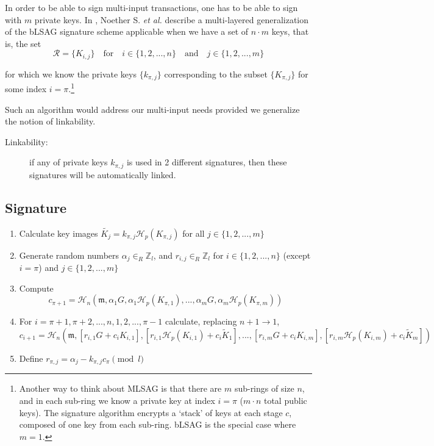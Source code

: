 In order to be able to sign multi-input transactions, one has to be able to sign with
\(m\) private keys. In \cite{cryptoeprint:2015:1098, ledger34}, Noether S. {\em et al.} describe a multi-layered generalization of the bLSAG signature scheme applicable when we have a set of \(n \cdot m\) keys, that is, the set\\
\[\mathcal{R} = \{ K_{i,j} \}  \quad \textrm{for} \quad  i \in \{1, 2, ..., n\} \quad \textrm{and} \quad j \in \{1, 2, ..., m\}\] 

for which we know the private keys \(\{k_{\pi, j} \} \) corresponding to the subset \(\{K_{\pi, j}\} \) for some index \(i = \pi\).\footnote{\label{mlsag_note}Another way to think about MLSAG is that there are $m$ sub-rings of size $n$, and in each sub-ring we know a private key at index $i = \pi$ ($m \cdot n$ total public keys). The signature algorithm encrypts a ‘stack’ of keys at each stage $c$, composed of one key from each sub-ring. bLSAG is the special case where $m = 1$.}

Such an algorithm would address our multi-input needs provided we generalize the notion of linkability.

\begin{description}
	\item[Linkability:] if any of private keys \(k_{\pi, j}\) is used in 2 different signatures, then these signatures will be automatically linked.
\end{description}

\newpage
\subsection*{Signature}

\begin{enumerate}
	
	\item Calculate key images \(\tilde{K_j} = k_{\pi, j} \mathcal{H}_p(K_{\pi, j})\) for all \(j \in \{1, 2, ..., m\}\)
	
	\item Generate random numbers  \(\alpha_j \in_R \mathbb{Z}_l\), and \(r_{i, j} \in_R \mathbb{Z}_l\) for \(i \in \{1, 2, ..., n\}\) (except \(i = \pi\)) and \(j \in \{1, 2, ..., m\}\) 
	
	\item Compute 
	\[
	c_{\pi+1} = \mathcal{H}_n(\mathfrak{m}, \alpha_1 G, \alpha_1 \mathcal{H}_p(K_{\pi, 1}), ..., \alpha_m G, \alpha_m \mathcal{H}_p(K_{\pi, m}))
	\]
	
	\item For \(i = \pi+1, \pi+2, ..., n, 1, 2, ..., \pi-1\) calculate, replacing \(n + 1 \rightarrow 1\),\\
	\[  c_{i+1} = \mathcal{H}_n(\mathfrak{m}, [r_{i, 1} G + c_i K_{i, 1}], [r_{i, 1} \mathcal{H}_p(K_{i, 1}) + c_i \tilde{K}_1], 
	..., [r_{i, m} G + c_i K_{i, m}], [r_{i, m} \mathcal{H}_p(K_{i, m}) + c_i \tilde{K}_m])  \] 
	
	
	\item Define \(r_{\pi, j} = \alpha_j -k_{\pi, j} c_\pi \pmod l\)
	
\end{enumerate}

